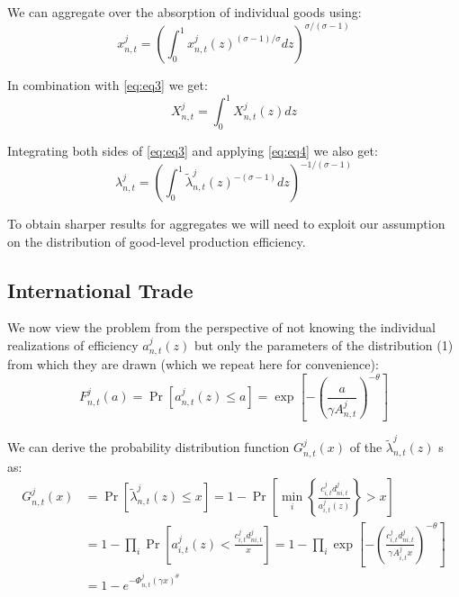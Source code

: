 \documentclass[12pt, bibtotoc, tablecaptionabove, figurecaptionabove, fleqn]{article}
\begin{document}
We can aggregate over the absorption of individual goods using:
\begin{equation*}
x_{n, t}^{j}=\left(\int_{0}^{1} x_{n, t}^{j}(z)^{(\sigma-1) / \sigma} d z\right)^{\sigma /(\sigma-1)}
\end{equation*}

In combination with \ref{eq:eq3} we get: 
\begin{equation}\label{eq:eq4}
X_{n, t}^{j}=\int_{0}^{1} X_{n, t}^{j}(z) d z
\end{equation}

Integrating both sides of \ref{eq:eq3} and applying \ref{eq:eq4} we also get:
\begin{equation}\label{eq:integral}
\lambda_{n, t}^{j}=\left(\int_{0}^{1} \tilde{\lambda}_{n, t}^{j}(z)^{-(\sigma-1)} d z\right)^{-1 /(\sigma-1)}
\end{equation}

To obtain sharper results for aggregates we will need to exploit our assumption on the distribution of good-level production efficiency.


\subsection{International Trade}
We now view the problem from the perspective of not knowing the individual realizations of efficiency $a_{n, t}^{j}(z)$ but only the parameters of the distribution (1) from which they are drawn (which we repeat here for convenience):
\begin{equation*}
F_{n, t}^{j}(a)=\operatorname{Pr}\left[a_{n, t}^{j}(z) \leq a\right]=\exp \left[-\left(\frac{a}{\gamma A_{n, t}^{j}}\right)^{-\theta}\right]
\end{equation*}

We can derive the probability distribution function $G_{n, t}^{j}(x)$ of the $\tilde{\lambda}_{n, t}^{j}(z)$ s as:
\begin{equation*}
	\begin{aligned}
G_{n, t}^{j}(x) &=\operatorname{Pr}\left[\tilde{\lambda}_{n, t}^{j}(z) \leq x\right]=1-\operatorname{Pr}\left[\min _{i}\left\{\frac{c_{i, t}^{j} d_{n i, t}^{j}}{a_{i, t}^{j}(z)}\right\}>x\right] \\
&=1-\prod_{i} \operatorname{Pr}\left[a_{i, t}^{j}(z)<\frac{c_{i, t}^{j} d_{n i, t}^{j}}{x}\right]=1-\prod_{i} \exp \left[-\left(\frac{c_{i, t}^{j} d_{n i, t}^{j}}{\gamma A_{i, t}^{j} x}\right)^{-\theta}\right] \\
&=1-e^{-\Phi_{n, t}^{j}(\gamma x)^{\theta}}
\end{aligned}
\end{equation*}
\end{document}
